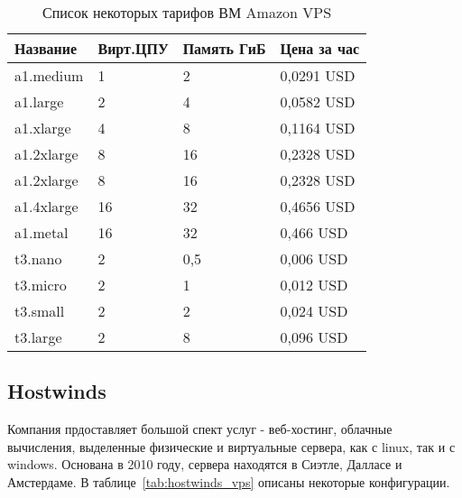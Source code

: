 \begin{table} [htbp]%
  \centering
  \begin{threeparttable}%
    \caption{Список некоторых тарифов ВМ Amazon VPS}
    \label{tab:awazon_vps}%
    \renewcommand{\arraystretch}{1}%
    \begin{SingleSpace}
      \begin{tabular}{@{}@{\extracolsep{20pt}}llll@{}}
        \toprule     %
          Название & Вирт.ЦПУ & Память ГиБ & Цена за час \\
        \midrule %
          a1.medium & 1 & 2 & 0,0291 USD \\
          a1.large & 2 & 4 & 0,0582 USD \\
          a1.xlarge & 4 & 8 & 0,1164 USD \\
          a1.2xlarge & 8 & 16 & 0,2328 USD \\
          a1.2xlarge & 8 & 16 & 0,2328 USD \\
          a1.4xlarge & 16 & 32 & 0,4656 USD \\
          a1.metal & 16 & 32 & 0,466 USD \\
          t3.nano & 2 & 0,5 & 0,006 USD \\
          t3.micro & 2 & 1 & 0,012 USD \\
          t3.small & 2 & 2 & 0,024 USD \\
          t3.large & 2 & 8 & 0,096 USD \\
        \bottomrule %
      \end{tabular}%
    \end{SingleSpace}
  \end{threeparttable}
\end{table}

\subsection{Hostwinds}\label{sec:hostwinds}
Компания прдоставляет большой спект услуг - веб-хостинг, облачные вычисления, выделенные физические и виртуальные сервера, как с linux, так и с windows. Основана в 2010 году, сервера находятся в Сиэтле, Далласе и Амстердаме. 
\newline
В таблице~\ref{tab:hostwinds_vps} описаны некоторые конфигурации.

